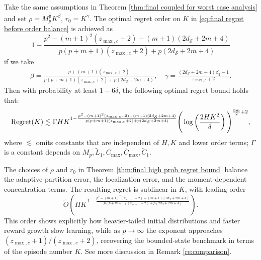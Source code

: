 \documentclass[final,supplement]{siamart251216}
\begin{document}
\begin{theorem} \label{thm:final high prob regret bound}
 Take the same assumptions in Theorem \ref{thm:final coupled for worst case analysis} and set $\rho=M_{p}^{\frac{1}{p}}K^{\beta}$, $r_{0}=K^{\gamma}$. The optimal regret order on $K$ in \eqref{eq:final regret before order balance} is achieved as
 \[
 1-\frac{p^{2}-(m+1)^{2}(z_{\max,c}+2)-(m+1)(2d_{\mathcal{S}}+2m+4)}{p(p+m+1)(z_{\max,c}+2)+p(2d_{\mathcal{S}}+2m+4)}
 \]
 if we
take 
\begin{eqnarray*}
    \beta=\frac{p+(m+1)(z_{\max,c}+2)}{p(p+m+1)(z_{\max,c}+2)+p(2d_{\mathcal{S}}+2m+4)},\quad \gamma=\frac{(2d_{\mathcal{S}}+2m+4)\beta_{2}-1}{z_{\max,c}+2}.
\end{eqnarray*}
 Then with probability at least $1-6\delta$, the following optimal regret bound holds that:
\begin{eqnarray}\label{eq:final regret with leading term shown}
{\rm Regret}(K) \lesssim \Gamma HK^{1-\frac{p^{2}-(m+1)^{2}(z_{\max,c}+2)-(m+1)(2d_{\mathcal{S}}+2m+4)}{p(p+m+1)(z_{\max,c}+2)+p(2d_{\mathcal{S}}+2m+4)}}{{\Bigg(\log\left(\frac{2HK^{2}}{\delta}\right)\Bigg)^{\frac{3m}{2}+2}}},
\end{eqnarray}
where $\lesssim$ omits constants that  are independent of $H,K$ and lower order terms; $\Gamma$ is a constant depends on $M_{p},\widetilde{L}_{1},C_{\max}, \overline{C}_{\max},\widetilde{C}_{1}$. 
\end{theorem}
The choices of \(\rho\) and \(r_0\) in Theorem \ref{thm:final high prob regret bound} balance the adaptive-partition error, the localization error, and the moment-dependent concentration terms. The resulting regret is sublinear in \(K\), with leading order
\[
\widetilde O\!\left(
H K^{\,1-\frac{p^2-(m+1)^2(z_{\max,c}+2)-(m+1)(2d_S+2m+4)}
{p(p+m+1)(z_{\max,c}+2)+p(2d_S+2m+4)}}
\right).
\]
This order shows explicitly how heavier-tailed initial distributions and faster reward growth slow learning, while as \(p\to\infty\) the exponent approaches \((z_{\max,c}+1)/(z_{\max,c}+2)\), recovering the bounded-state benchmark in terms of the episode number \(K\). See more discussion in Remark \ref{re:comparison}.
\end{document}
